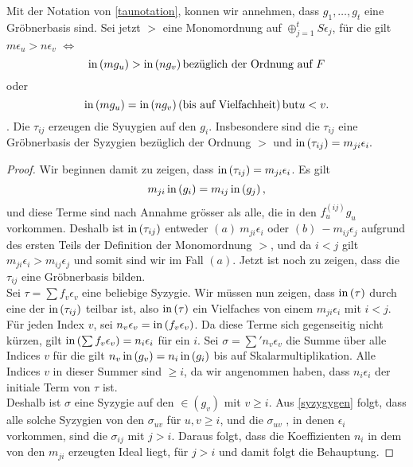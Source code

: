 \documentclass{article}
\begin{document}
\begin{thm}[Schreyer \cite{Eis1}[15.10]
	Mit der Notation von \ref{taunotation}, 
	konnen wir annehmen,
	dass
	\( g_1,\dots,g_t\)
	eine Gr\"obnerbasis sind.
	Sei jetzt 
	\( > \) 
	eine Monomordnung auf 
	\( \oplus_{j=1}^t S \epsilon_{j} \),
	f\"ur die gilt
	\( m \epsilon_{u} > n \epsilon_{v} \)
	\(\iff\)
	\[
		\operatorname{in}\left(  m g_{u} \right) > \operatorname{in}\left( n g_{v} \right) 
		\text{bez\"uglich der Ordnung auf } F 
	\]
	oder
	\[
		\operatorname{in}\left( m g_{u} \right) = \operatorname{in}\left( n g_{v} \right) 
		\left( \text{bis auf Vielfachheit} \right) \text{but} u < v.
	\].
	Die
	\( \tau_{ij} \) 
	erzeugen die Syuygien auf den
	\( g_{i} \).
	Insbesondere sind die
	\( \tau_{ij} \)
	eine Gr\"obnerbasis der Syzygien bez\"uglich der Ordnung
	\( > \)
	und 
	\( \operatorname{in}\left( \tau_{ij} \right) = m_{ji}\epsilon_{i}.\)
	\begin{proof}
		Wir beginnen damit zu zeigen, dass
		\( \operatorname{in} \left( \tau_{ij} \right) 
		=
		m_{ji} \epsilon_{i} \).
		Es gilt 
		\[
			m_{ji} \operatorname{in} \left( g_{i} \right) 
			= m_{ij} \operatorname{in} \left( g_{j} \right),
		\]
		und diese Terme sind nach Annahme gr\"osser als alle,
		die in den 
		\( f_{u}^{\left( ij \right)} g_{u} \)
		vorkommen.
		Deshalb ist
		\( \operatorname{in}\left( \tau_{ij} \right) \)
		entweder
		\( (a) \ m_{ji} \epsilon_{i} \)
		oder
		\( (b) \ -m_{ij}\epsilon_{j} \)
		aufgrund des ersten Teils der Definition der Monomordnung
		\( > \),
		und da
		\( i < j \)
		gilt
		\( m_{ji} \epsilon_{i} 
		> m_{ij}\epsilon_{j} \)
		und somit sind wir im Fall 
		\( (a) \).
		Jetzt ist noch zu zeigen,
		dass die 
		\( \tau_{ij} \)
		eine Gr\"obnerbasis bilden. \\
		Sei 
		\( \tau = \sum f_{v} \epsilon_{v}\)
		eine beliebige Syzygie.
		Wir m\"ussen nun zeigen,
		dass 
		\( \operatorname{in}\left( \tau \right) \)
		durch eine der 
		\( \operatorname{in}\left( \tau_{ij} \right)\)
		teilbar ist,
		also
		\( \operatorname{in}\left( \tau \right) \)
		ein Vielfaches von einem
		\( m_{ji} \epsilon_{i} \)
		mit
		\( i<j \).\\
		F\"ur jeden Index
		\(v \),
		sei
		\(n_{v} \epsilon_{v}
		=\operatorname{in}\left( f_{v}\epsilon_{v} \right) \).
		Da diese Terme sich gegenseitig nicht k\"urzen,
		gilt
		\( \operatorname{in}\left( \sum f_{v}\epsilon_{v} \right)=
		n_{i}\epsilon_{i}\)
		f\"ur ein 
		\( i\).
		Sei
		\( \sigma=\sum'n_{v} \epsilon_{v} \)
		die Summe \"uber alle Indices
		\( v \)
		f\"ur die gilt
		\( n_v \operatorname{in} \left( g_{v} \right)
		=n_{i} \operatorname{in}\left( g_{i} \right) \)
		bis auf Skalarmultiplikation.
		Alle Indices
		\( v \)
		in dieser Summer sind 
		\( \ge i \),
		da wir angenommen haben,
		dass 
		\( n_{i} \epsilon_{i} \)
		der initiale Term von 
		\( \tau \)
		ist. \\
		Deshalb ist 
		\( \sigma \)
		eine Syzygie auf den
		\( \in\left( g_{v} \right) \)
		mit 
		\( v \ge i\).
		Aus  \ref{syzygygen} 
		folgt, 
		dass alle solche Syzygien von den
		\( \sigma_{uv} \)
		f\"ur 
		\( u,v \ge i \),
		und die 
		\( \sigma_{uv} \) ,
		in denen 
		\( \epsilon_{i} \) 
		vorkommen,
		sind die
		\( \sigma_{ij}\)
		mit
		\( j > i \).
		Daraus folgt, 
		dass die Koeffizienten 
		\(n_{i}\)
		in dem von den 
		\(m_{ji}\) 
		erzeugten Ideal liegt,
		f\"ur 
		\( j> i \)
		und damit folgt die Behauptung.
	\end{proof}
\end{thm}
\end{document}
